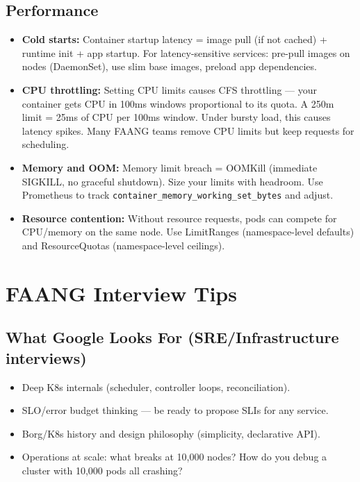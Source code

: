 \documentclass[11pt]{article}
\providecommand{\tightlist}{\setlength{\itemsep}{1pt}\setlength{\parskip}{0pt}}
\begin{document}
\subsection{Performance}\label{performance}

\begin{itemize}
\tightlist
\item
  \textbf{Cold starts:} Container startup latency = image pull (if not cached) + runtime init + app startup. For latency-sensitive services: pre-pull images on nodes (DaemonSet), use slim base images, preload app dependencies.
\item
  \textbf{CPU throttling:} Setting CPU limits causes CFS throttling --- your container gets CPU in 100ms windows proportional to its quota. A 250m limit = 25ms of CPU per 100ms window. Under bursty load, this causes latency spikes. Many FAANG teams remove CPU limits but keep requests for scheduling.
\item
  \textbf{Memory and OOM:} Memory limit breach = OOMKill (immediate SIGKILL, no graceful shutdown). Size your limits with headroom. Use Prometheus to track \texttt{container\_memory\_working\_set\_bytes} and adjust.
\item
  \textbf{Resource contention:} Without resource requests, pods can compete for CPU/memory on the same node. Use LimitRanges (namespace-level defaults) and ResourceQuotas (namespace-level ceilings).
\end{itemize}

\section{FAANG Interview Tips}\label{faang-interview-tips}

\subsection{What Google Looks For (SRE/Infrastructure interviews)}\label{what-google-looks-for-sreinfrastructure-interviews}

\begin{itemize}
\tightlist
\item
  Deep K8s internals (scheduler, controller loops, reconciliation).
\item
  SLO/error budget thinking --- be ready to propose SLIs for any service.
\item
  Borg/K8s history and design philosophy (simplicity, declarative API).
\item
  Operations at scale: what breaks at 10,000 nodes? How do you debug a cluster with 10,000 pods all crashing?
\end{itemize}
\end{document}
